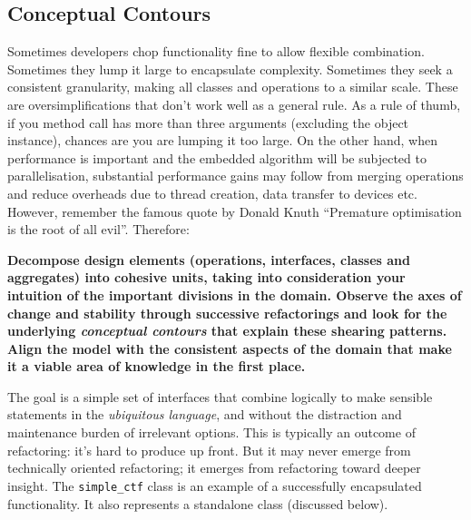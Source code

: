 \documentclass[a4paper,11pt]{article}
\begin{document}
\subsection{Conceptual Contours}
Sometimes developers chop functionality fine to allow flexible combination. Sometimes they lump it large to encapsulate complexity. Sometimes they seek a consistent granularity, making all classes and operations to a similar scale. These are oversimplifications that don't work well as a general rule. As a rule of thumb, if you method call has more than three arguments (excluding the object instance), chances are you are lumping it too large. On the other hand, when performance is important and the embedded algorithm will be subjected to parallelisation, substantial performance gains may follow from merging operations and reduce overheads due to thread creation, data transfer to devices etc. However, remember the famous quote by Donald Knuth ``Premature optimisation is the root of all evil''. Therefore:

\textbf{Decompose design elements (operations, interfaces, classes and aggregates) into cohesive units, taking into consideration your intuition of the important divisions in the domain. Observe the axes of change and stability through successive refactorings and look for the underlying \textit{conceptual contours} that explain these shearing patterns. Align the model with the consistent aspects of the domain that make it a viable area of knowledge in the first place.}

The goal is a simple set of interfaces that combine logically to make sensible statements in the \textit{ubiquitous language}, and without the distraction and maintenance burden of irrelevant options. This is typically an outcome of refactoring: it's hard to produce up front. But it may never emerge from technically oriented refactoring; it emerges from refactoring toward deeper insight. The \texttt{simple\_ctf} class is an example of a successfully encapsulated functionality. It also represents a standalone class (discussed below).
\end{document}
